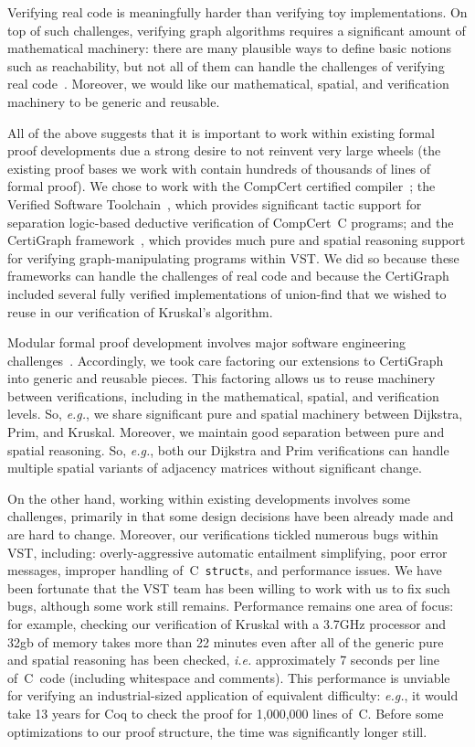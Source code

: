 Verifying real code is meaningfully harder than verifying toy implementations.  On top of such challenges, verifying graph algorithms requires a significant amount of mathematical machinery: there are many plausible ways to define basic notions such as reachability, but not all of them can handle the challenges of verifying real code~\cite{shengyi:thesis}.  Moreover, we would like our mathematical, spatial, and verification machinery to be generic and reusable.

All of the above suggests that it is important to work within existing formal proof developments due a strong desire to not reinvent very large wheels (the existing proof bases we work with contain hundreds of thousands of lines of formal proof).  We chose to work with the CompCert certified compiler~\cite{leroy:compcert}; the Verified Software Toolchain~\cite{appel:programlogics}, which provides significant tactic support for separation logic-based deductive verification of CompCert~C programs; and the CertiGraph framework~\cite{DBLP:journals/pacmpl/WangCMH19}, which provides much pure and spatial reasoning support for verifying graph-manipulating programs within VST.  We did so because these frameworks can handle the challenges of real code and because the CertiGraph included several fully verified implementations of union-find that we wished to reuse in our verification of Kruskal's algorithm.

Modular formal proof development involves major software engineering challenges~\cite{DBLP:journals/corr/abs-2003-06458}.
Accordingly, we took care factoring our extensions to CertiGraph into generic and reusable pieces.  This factoring allows us to reuse machinery between verifications, including in the mathematical, spatial, and verification levels. So, \emph{e.g.}, we share significant pure and spatial machinery between Dijkstra, Prim, and Kruskal.  Moreover, we maintain good separation between pure and spatial reasoning. So, \emph{e.g.}, both our Dijkstra and Prim verifications can handle multiple spatial variants of adjacency matrices without significant change.

On the other hand, working within existing developments involves some challenges, primarily in that some design decisions have been already made and are hard to change.  Moreover, our verifications tickled numerous bugs within VST, including: overly-aggressive automatic entailment simplifying, poor error messages, improper handling of~C~\texttt{struct}s, and performance issues.  We have been fortunate that the VST team has been willing to work with us to fix such bugs, although some work still remains.  Performance remains one area of focus: for example, checking our verification of Kruskal with a 3.7GHz processor and 32gb of memory takes more than 22 minutes even after all of the generic pure and spatial reasoning has been checked, \emph{i.e.} approximately 7 seconds per line of~C~code (including whitespace and comments).  This performance is unviable for verifying an industrial-sized application of equivalent difficulty: \emph{e.g.}, it would take 13 years for Coq to check the proof for 1,000,000 lines of~C.  Before some optimizations to our proof structure, the time was significantly longer still.

